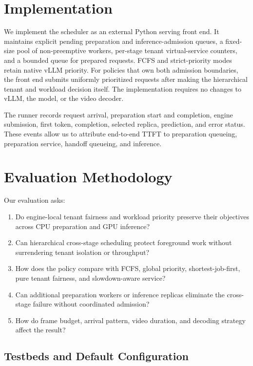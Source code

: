 \documentclass[sigconf,review,anonymous]{acmart}
\begin{document}
\section{Implementation}
\label{sec:implementation}

We implement the scheduler as an external Python serving front end. It
maintains explicit pending preparation and inference-admission queues, a
fixed-size pool of non-preemptive workers, per-stage tenant virtual-service
counters, and a bounded queue for prepared requests. FCFS and strict-priority
modes retain native vLLM priority. For policies that own both admission
boundaries, the front end submits uniformly prioritized requests after making
the hierarchical tenant and workload decision itself. The implementation
requires no changes to vLLM, the model, or the video decoder.

The runner records request arrival, preparation start and completion, engine
submission, first token, completion, selected replica, prediction, and error
status. These events allow us to attribute end-to-end TTFT to preparation
queueing, preparation service, handoff queueing, and inference.

\section{Evaluation Methodology}
\label{sec:evaluation-methodology}

Our evaluation asks:

\begin{enumerate}
    \item Do engine-local tenant fairness and workload priority preserve their
    objectives across CPU preparation and GPU inference?
    \item Can hierarchical cross-stage scheduling protect foreground work
    without surrendering tenant isolation or throughput?
    \item How does the policy compare with FCFS, global priority,
    shortest-job-first, pure tenant fairness, and slowdown-aware service?
    \item Can additional preparation workers or inference replicas eliminate
    the cross-stage failure without coordinated admission?
    \item How do frame budget, arrival pattern, video duration, and decoding
    strategy affect the result?
\end{enumerate}

\subsection{Testbeds and Default Configuration}
\end{document}
